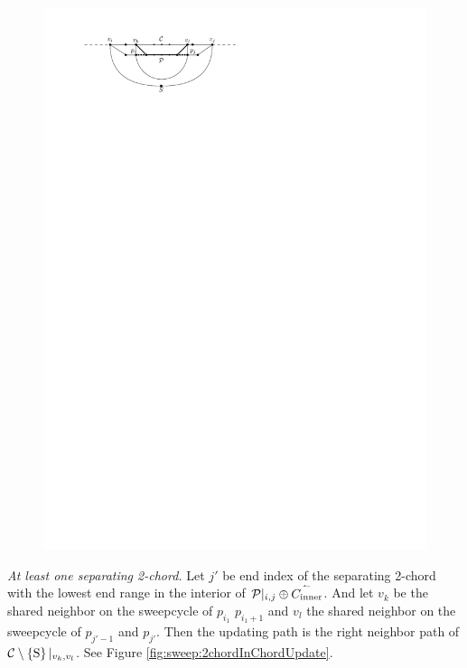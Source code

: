     \begin{figure}[h]
      \centering
      \includegraphics[scale=1]{unifiedAlgo/img/sweep/chordUpdate}
      \caption{}
      \label{fig:sweep:chordUpdate}
    \end{figure}

    \emph{At least one separating 2-chord.}
      Let $j'$ be end index of the separating 2-chord with the lowest end range in the interior of $\mathcal{P}|_{i, j} \oplus \accentset{\leftharpoonup}{{C_\text{inner}}}$. And let $v_k$ be the shared neighbor on the sweepcycle of $p_{i_1}$ $p_{i_1 +1}$ and $v_l$ the shared neighbor on the sweepcycle  of $p_{j' -1}$ and $p_{j'}$.
      Then the updating path is the  right neighbor path of $\mathcal{C} \setminus \left\lbrace {\mathrm{S}} \right\rbrace|_{v_k, v_l}$. See Figure \ref{fig:sweep:2chordInChordUpdate}.

